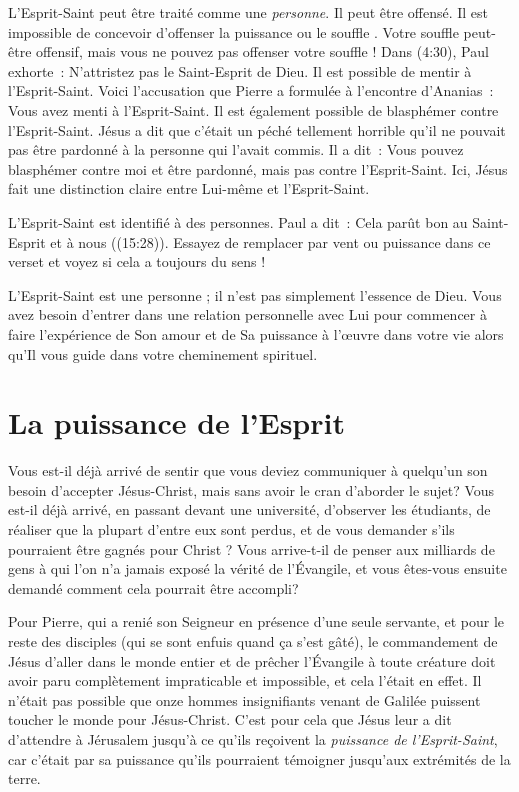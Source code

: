 L'Esprit-Saint peut être traité comme une \emph{personne}. Il peut être offensé.
 Il est impossible de concevoir d'offenser \og la puissance \fg{} ou
 \og le souffle \fg{}. Votre souffle peut-être offensif, mais vous ne pouvez
 pas offenser votre souffle ! Dans (4:30), Paul exhorte~:
 \og N'attristez pas le Saint-Esprit de Dieu. \fg{}
 Il est possible de mentir à l'Esprit-Saint. Voici l'accusation que Pierre a
 formulée à l'encontre d'Ananias~:
 \og Vous avez menti à l'Esprit-Saint. \fg{}
 Il est également possible de blasphémer contre l'Esprit-Saint.
 Jésus a dit que c'était un péché tellement horrible qu'il ne pouvait pas
 être pardonné à la personne qui l'avait commis. Il a dit~:
 \og Vous pouvez blasphémer contre moi et être pardonné, mais pas contre
 l'Esprit-Saint. \fg{}
 Ici, Jésus fait une distinction claire entre Lui-même et l'Esprit-Saint.

L'Esprit-Saint est identifié à des personnes. Paul a dit~:
 \og Cela parût bon au Saint-Esprit et à nous \fg{}
 ((15:28)).
 Essayez de remplacer par vent ou puissance dans ce verset et voyez si cela
 a toujours du sens !

L'Esprit-Saint est une personne ; il n'est pas simplement l'essence de Dieu.
 Vous avez besoin d'entrer dans une relation personnelle avec Lui pour
 commencer à faire l'expérience de Son amour et de Sa puissance à l'œuvre
 dans votre vie alors qu'Il vous guide dans votre cheminement spirituel.


\section{La puissance de l'Esprit}

Vous est-il déjà arrivé de sentir que vous deviez communiquer à quelqu'un
son besoin d'accepter Jésus-Christ, mais sans avoir le cran d'aborder le sujet?
 Vous est-il déjà arrivé, en passant devant une université,
 d'observer les étudiants, de réaliser que la plupart d'entre eux sont perdus,
 et de vous demander s'ils pourraient être gagnés pour Christ ?
 Vous arrive-t-il de penser aux milliards de gens à qui l'on n'a jamais
 exposé la vérité de l'Évangile, et vous êtes-vous ensuite demandé
 comment cela pourrait être accompli?

Pour Pierre, qui a renié son Seigneur en présence d'une seule servante,
 et pour le reste des disciples (qui se sont enfuis quand ça s'est gâté),
 le commandement de Jésus d'aller dans le monde entier et de prêcher
 l'Évangile à toute créature doit avoir paru complètement impraticable et
 impossible, et cela l'était en effet.
 Il n'était pas possible que onze hommes insignifiants venant de Galilée
 puissent toucher le monde pour Jésus-Christ.
 C'est pour cela que Jésus leur a dit d'attendre à Jérusalem jusqu'à ce
 qu'ils reçoivent la \emph{puissance de l'Esprit-Saint}, car c'était par
 sa puissance qu'ils pourraient témoigner jusqu'aux extrémités de la terre.

